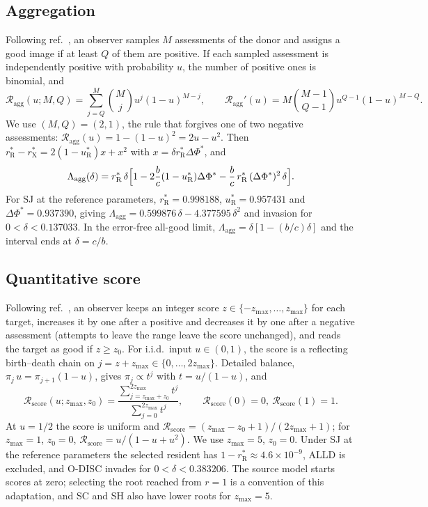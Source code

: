 \documentclass[fleqn,10pt]{article}
\theoremstyle{plain}
\theoremstyle{remark}
\newcommand{\Rm}{\mathcal R}
\newcommand{\rR}{r^*_{\mathrm R}}
\newcommand{\uR}{u^*_{\mathrm R}}
\begin{document}
\subsection{Aggregation}
Following ref.~\cite{michelmata2024}, an observer samples $M$ assessments of the
donor and assigns a good image if at least $Q$ of them are positive. If each
sampled assessment is independently positive with probability $u$, the number
of positive ones is binomial, and
\begin{equation}
\Rm_{\mathrm{agg}}(u;M,Q)=\sum_{j=Q}^{M}\binom Mj u^j(1-u)^{M-j},
\qquad
\Rm_{\mathrm{agg}}'(u)=M\binom{M-1}{Q-1}u^{Q-1}(1-u)^{M-Q}.
\label{eq:S-agg}
\end{equation}
We use $(M,Q)=(2,1)$, the rule that forgives one of two negative assessments:
$\Rm_{\mathrm{agg}}(u)=1-(1-u)^2=2u-u^2$. Then
$\rR-r^*_{\mathrm X}=2(1-\uR)x+x^2$ with $x=\delta\rR\Delta\Phi^*$, and
\begin{equation}
\Lambda_{\mathrm{agg}}(\delta)=\rR\,\delta\Bigl[1-2\frac bc(1-\uR)\Delta\Phi^*
-\frac bc\,\rR\,(\Delta\Phi^*)^2\,\delta\Bigr].
\label{eq:S-agg-Lambda}
\end{equation}
For SJ at the reference parameters, $\rR=0.998188$, $\uR=0.957431$ and
$\Delta\Phi^*=0.937390$, giving
$\Lambda_{\mathrm{agg}}=0.599876\,\delta-4.377595\,\delta^2$ and invasion for
$0<\delta<0.137033$. In the error-free all-good limit,
$\Lambda_{\mathrm{agg}}=\delta[1-(b/c)\delta]$ and the interval ends at $\delta=c/b$.

\subsection{Quantitative score}
Following ref.~\cite{schmid2023}, an observer keeps an integer score
$z\in\{-z_{\max},\dots,z_{\max}\}$ for each target, increases it by one after a
positive and decreases it by one after a negative assessment (attempts to leave
the range leave the score unchanged), and reads the target as good if
$z\ge z_0$. For i.i.d.\ input $u\in(0,1)$, the score is a reflecting birth--death
chain on $j=z+z_{\max}\in\{0,\dots,2z_{\max}\}$. Detailed balance,
$\pi_j\,u=\pi_{j+1}(1-u)$, gives $\pi_j\propto t^j$ with $t=u/(1-u)$, and
\begin{equation}
\Rm_{\mathrm{score}}(u;z_{\max},z_0)=
\frac{\sum_{j=z_{\max}+z_0}^{2z_{\max}}t^j}{\sum_{j=0}^{2z_{\max}}t^j},
\qquad \Rm_{\mathrm{score}}(0)=0,\ \Rm_{\mathrm{score}}(1)=1 .
\label{eq:S-score}
\end{equation}
At $u=1/2$ the score is uniform and $\Rm_{\mathrm{score}}=(z_{\max}-z_0+1)/(2z_{\max}+1)$;
for $z_{\max}=1$, $z_0=0$, $\Rm_{\mathrm{score}}=u/(1-u+u^2)$. We use $z_{\max}=5$,
$z_0=0$. Under SJ at the reference parameters the selected resident has
$1-\rR\approx4.6\times10^{-9}$, ALLD is excluded, and O-DISC invades for
$0<\delta<0.383206$. The source model starts scores at zero; selecting the root
reached from $r=1$ is a convention of this adaptation, and SC and SH also have
lower roots for $z_{\max}=5$.
\end{document}
